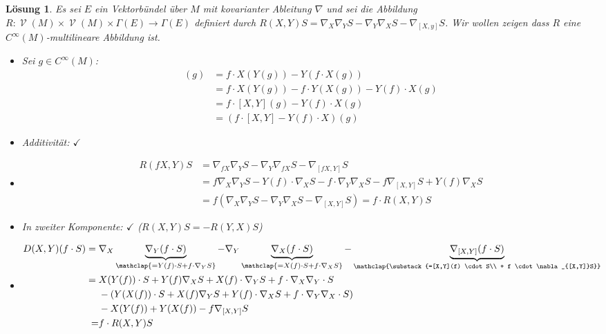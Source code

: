 \documentclass[paper=A4, twoside, chapterprefix=true, bibliography=totoc, headsepline]{scrbook}
\DeclareMathOperator{\calV}{\mathcal{V}}
\newcommand{\X}{\times}
\theoremstyle{plain}
\theoremstyle{nonumberplain}
\theoremstyle{empty}
\theoremstyle{break}
\newtheorem{Loes}{L\"osung}
\begin{document}
\begin{Loes}
Es sei $E$ ein Vektorb\"undel \"uber $M$ mit kovarianter Ableitung $\nabla$ und sei die Abbildung $R: \calV(M) \X \calV(M) \X \Gamma(E) \to \Gamma(E)$ definiert durch $R(X, Y)S = \nabla_X\nabla_YS - \nabla_Y\nabla_XS - \nabla_{[X,y]}S$. Wir wollen zeigen dass $R$ eine $C^\infty(M)$-multilineare Abbildung ist.
\begin{itemize}[leftmargin=*]
\item
	Sei $g \in C^\infty(M)$:
	\begin{align*}
		[fX,Y](g) &= f \cdot X(Y(g)) - Y(f \cdot X(g))\\
		&= f \cdot X(Y(g)) - f \cdot Y(X(g)) - Y(f) \cdot X(g)\\
		&= f \cdot [X,Y](g) - Y(f) \cdot X(g)\\
		&= (f \cdot [X,Y] - Y(f) \cdot X)(g)
	\end{align*}
\item
	Additivit\"at: $\checkmark$
\item
	\begin{align*}
		R(fX,Y)S &= \nabla_{fX}\nabla_YS - \nabla_Y\nabla_{fX}S - \nabla_{[fX,Y]}S\\
		&= f\nabla_X\nabla_YS - Y(f) \cdot \nabla_XS - f \cdot \nabla_Y\nabla_XS - f\nabla_{[X,Y]}S + Y(f)\nabla_XS\\
		&= f(\nabla_X\nabla_YS - \nabla_Y\nabla_XS - \nabla_{[X,Y]}S) = f \cdot R(X,Y) S
	\end{align*}
\item
	In zweiter Komponente: $\checkmark$ ($R(X,Y)S = -R(Y,X)S$)
\item
	\begin{align*}
		D(X,Y)(f \cdot S) = {} & \nabla_X\underbrace{\nabla_Y(f \cdot S)}_{\mathclap{=Y(f)\cdot S + f \cdot \nabla_YS}} - \nabla_Y\underbrace{\nabla_X(f\cdot S)}_{\mathclap{=X(f) \cdot S + f \cdot \nabla_XS}} - \underbrace{\nabla_{[X,Y]}(f\cdot S)}_{\mathclap{\substack{=[X,Y](f) \cdot S\\ + f \cdot \nabla_{[X,Y]}S}}}\\
		= {} & X(Y(f)) \cdot S + Y(f)\nabla_XS + X(f) \cdot \nabla_YS + f \cdot \nabla_X\nabla_Y \cdot S\\
		 & -(Y(X(f)) \cdot S + X(f)\nabla_YS + Y(f)\cdot\nabla_XS + f\cdot\nabla_Y\nabla_X\cdot S)\\
		 & -X(Y(f)) + Y(X(f)) - f\nabla_{[X,Y]}S \\ =& f \cdot R(X,Y)S
	\end{align*}
\end{itemize}\end{Loes}
\end{document}
